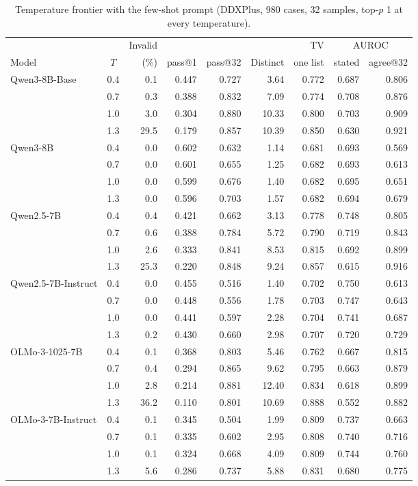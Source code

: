 \documentclass[wcp]{jmlr}
\begin{document}
\begin{table}[t]
\centering\small
\begin{adjustbox}{max width=\linewidth}
\begin{tabular}{lcrrrrrrr}
\toprule
 & & Invalid & & & & TV & \multicolumn{2}{c}{AUROC} \\
Model & $T$ & (\%) & pass@1 & pass@32 & Distinct & one list & stated & agree@32 \\
\midrule
Qwen3-8B-Base & 0.4 & 0.1 & 0.447 & 0.727 & 3.64 & 0.772 & 0.687 & 0.806 \\
 & 0.7 & 0.3 & 0.388 & 0.832 & 7.09 & 0.774 & 0.708 & 0.876 \\
 & 1.0 & 3.0 & 0.304 & 0.880 & 10.33 & 0.800 & 0.703 & 0.909 \\
 & 1.3 & 29.5 & 0.179 & 0.857 & 10.39 & 0.850 & 0.630 & 0.921 \\
Qwen3-8B & 0.4 & 0.0 & 0.602 & 0.632 & 1.14 & 0.681 & 0.693 & 0.569 \\
 & 0.7 & 0.0 & 0.601 & 0.655 & 1.25 & 0.682 & 0.693 & 0.613 \\
 & 1.0 & 0.0 & 0.599 & 0.676 & 1.40 & 0.682 & 0.695 & 0.651 \\
 & 1.3 & 0.0 & 0.596 & 0.703 & 1.57 & 0.682 & 0.694 & 0.679 \\
\midrule
Qwen2.5-7B & 0.4 & 0.4 & 0.421 & 0.662 & 3.13 & 0.778 & 0.748 & 0.805 \\
 & 0.7 & 0.6 & 0.388 & 0.784 & 5.72 & 0.790 & 0.719 & 0.843 \\
 & 1.0 & 2.6 & 0.333 & 0.841 & 8.53 & 0.815 & 0.692 & 0.899 \\
 & 1.3 & 25.3 & 0.220 & 0.848 & 9.24 & 0.857 & 0.615 & 0.916 \\
Qwen2.5-7B-Instruct & 0.4 & 0.0 & 0.455 & 0.516 & 1.40 & 0.702 & 0.750 & 0.613 \\
 & 0.7 & 0.0 & 0.448 & 0.556 & 1.78 & 0.703 & 0.747 & 0.643 \\
 & 1.0 & 0.0 & 0.441 & 0.597 & 2.28 & 0.704 & 0.741 & 0.687 \\
 & 1.3 & 0.2 & 0.430 & 0.660 & 2.98 & 0.707 & 0.720 & 0.729 \\
\midrule
OLMo-3-1025-7B & 0.4 & 0.1 & 0.368 & 0.803 & 5.46 & 0.762 & 0.667 & 0.815 \\
 & 0.7 & 0.4 & 0.294 & 0.865 & 9.62 & 0.795 & 0.663 & 0.879 \\
 & 1.0 & 2.8 & 0.214 & 0.881 & 12.40 & 0.834 & 0.618 & 0.899 \\
 & 1.3 & 36.2 & 0.110 & 0.801 & 10.69 & 0.888 & 0.552 & 0.882 \\
OLMo-3-7B-Instruct & 0.4 & 0.1 & 0.345 & 0.504 & 1.99 & 0.809 & 0.737 & 0.663 \\
 & 0.7 & 0.1 & 0.335 & 0.602 & 2.95 & 0.808 & 0.740 & 0.716 \\
 & 1.0 & 0.1 & 0.324 & 0.668 & 4.09 & 0.809 & 0.744 & 0.760 \\
 & 1.3 & 5.6 & 0.286 & 0.737 & 5.88 & 0.831 & 0.680 & 0.775 \\
\bottomrule
\end{tabular}
\end{adjustbox}
\caption{Temperature frontier with the few-shot prompt (DDXPlus, 980 cases, 32 samples, top-$p$ 1 at every temperature).}
\label{tab:frontier}
\end{table}
\end{document}

